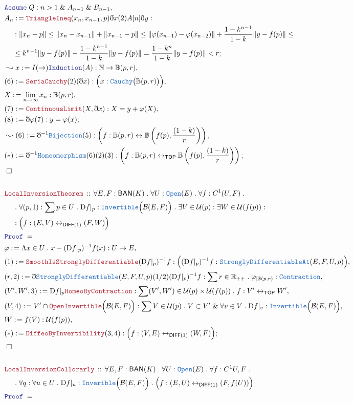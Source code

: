 \documentclass[12pt]{scrartcl}
\newcommand{\TYPE}[1]{\textcolor{NavyBlue}{\mathtt{#1}}}
\newcommand{\LOGIC}[1]{\textcolor{Blue}{\mathtt{#1}}}
\newcommand{\THM}[1]{\textcolor{Maroon}{\mathtt{#1}}}
\renewcommand{\.}{\; . \;}
\newcommand{\de}{: \kern 0.1pc =}
\newcommand{\Theorem}[2]{& \THM{#1} \, :: \, #2 \\ & \Proof = \\ }
\newcommand{\NewLine}{\\ & \kern 1pc}
\newcommand{\Page}[1]{\begin{align*} #1 \end{align*}   }
\newcommand{ \bd }{ \ByDef }
\renewcommand{\And}{\; \& \;}
\newcommand{\Reals}{\mathbb{R} }
\newcommand{\Nat}{\mathbb{N} }
\newcommand{\ToBij}{\leftrightarrow}
\newcommand{\Say}[3]{& #1 \de #2 : #3, \\}
\newcommand{\Conclude}[3]{& #1 \de #2 : #3; \\}
\newcommand{\Derive}[3]{& \leadsto #1 \de #2 : #3, \\}
\newcommand{\A}{\LOGIC{Assume} \;}
\newcommand{\Assume}[2]{& \A #1 : #2, \\}
\newcommand{\QED}{\; \square}
\newcommand{\EndProof}{& \QED \\}
\newcommand{\ByDef}{\eth}
\newcommand{\Proof}{\LOGIC{Proof} \; }
\newcommand{\Ball}{ \mathbb{B} }
\newcommand{\TOP}{\mathsf{TOP}}
\newcommand{\DIFF}{\mathsf{DIFF}}
\newcommand{\BAN}{\mathsf{BAN}} %
\newcommand{\D}{\mathrm{D}}
\newcommand{\B}{\mathcal{B}}
\begin{document}
\Page{
	\Assume{Q}{n > 1 \And A_{n - 1} \And B_{n - 1}}
	\Conclude{A_n}{ \THM{TriangleIneq}(x_n,x_{n - 1},p)  \bd x (2)A[n] \bd y  }
	{
		\NewLine :
		\| x_n - p \| \le  \| x_n - x_{n-1} \| + \| x_{n -1}  - p \| \le
		\| \varphi(x_{n-1}) - \varphi(x_{n-2}) \| + \frac{1 - k^{n-1}}{1 - k}\| y - f(p) \| \le
		\NewLine \le
		k^{n-1}\| y - f(p) \| - \frac{1 -k^{n -1}}{1 - k}\| y - f(p) \| = \frac{1 - k^n}{1 - k}\| y - f(p) \| < r
	}
	\Derive{x}{I(\to)\LOGIC{Induction}(A)}{\Nat \to \Ball(p,r)}
	\Say{(6)}{ \THM{SeriaCauchy}(2)(\bd x)}{ \Big( x : \TYPE{Cauchy}\big( \Ball(p,r) \big)  \Big) }
	\Say{ X  }{\lim_{n \to \infty} x_n}{\Ball(p,r)}
	\Say{(7)}{\THM{ContinuousLimit}(X,\bd x)}{ X = y + \varphi(X)}
	\Conclude{(8)}{ \bd \varphi (7)  }{y = \varphi(x)}
	\Derive{(6)}{\bd^{-1} \TYPE{Bijection}(5)}{\left(  f : \Ball(p,r) \ToBij  \Ball\left(f(p), \frac{(1-k)}{r}\right) \right)}
	\Conclude{(*)}{\bd^{-1} \TYPE{Homeomorphism}(6)(2)(3)}{ \left( f : \Ball(p,r) \ToBij_\TOP \Ball\left(f(p), \frac{(1-k)}{r}\right) \right)    }
	\EndProof
	\\
	\Theorem{LocalInversionTheorem}{
		\forall E,F : \BAN(K) \. \forall U : \TYPE{Open}(E) \. \forall f : C^1(U,F) \. 
		\NewLine \.
		\forall (p,1) : \sum p \in U \. \D f |_p : \TYPE{Invertible}\Big(  \B(E,F)   \Big) \.
		\exists V \in \mathcal{U}(p) : \exists W \in \mathcal{U}(f(p)) : 
		\NewLine :
		\Big( f : (E,V) \ToBij_{\DIFF(1)} (F,W)  \Big)
	}
	\Say{\varphi}{\Lambda x \in U \.  x - (\D f |_p )^{-1}f(x) }{U \to E}
	\Say{(1)}{\THM{SmoothIsStronglyDifferentiable}(\D f |_p)^{-1}f}{\Big( (\D f |_p)^{-1}f : \TYPE{StronglyDifferentiableAt}(E,F,U,p)  \Big)}
	\Say{(r,2)}{\bd \TYPE{StronglyDifferentiable}(E,F,U,p)(1/2) (\D f |_p)^{-1}f}{ \sum r \in \Reals_{++} \. \varphi_{|\Ball(p,r)} : \TYPE{Contraction}  }
	\Say{(V',W',3)}{\D f |_p \THM{HomeoByContraction}}{\sum (V',W') \in \mathcal{U}(p) \times \mathcal{U}(f(p)) \.  f : V' \ToBij_\TOP W'  }
	\Say{(V,4)}{V' \cap \THM{OpenInvertible}\Big( \B(E,F) \Big)}{ \sum V \in \mathcal{U}(p) \. V \subset V' \And \forall v \in V \. \D f |_v : \TYPE{Invertible}\Big( \B(E,F) \Big)}
	\Say{W}{f(V)}{\mathcal{U}(f(p))}
	\Conclude{(*)}{\THM{DiffeoByInvertibility}(3,4)}{ \Big( f : (V,E) \ToBij_{\DIFF(1)} (W,F)  \Big)  }
	\EndProof
	\\
	\Theorem{LocalInversionCollorarly}{
		\forall E,F : \BAN(K) \. \forall U : \TYPE{Open}(E) \. \forall f : C^1{U,F} \.
		\NewLine \.
		\forall q : \forall u \in U \. \D f |_u : \TYPE{Inverible}\Big( \B(E,F) \Big) \. 
		\Big( f : (E,U) \ToBij_{\DIFF(1)} (F,f(U))  \Big)
	}
}
\newpage
\end{document}
